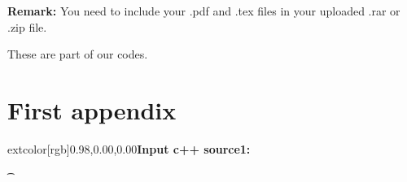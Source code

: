 \documentclass[12pt,a4paper]{article}
\theoremstyle{definition}
\begin{document}
\vspace{20pt}

\textbf{Remark:} You need to include your .pdf and .tex files in your uploaded .rar or .zip file.

\newpage


\begin{appendices}
    These are part of our codes.
    \section{First appendix}
    extcolor[rgb]{0.98,0.00,0.00}{\textbf{Input c++ source1:}}
    
    
    \t
    
\end{appendices}


\end{document}
